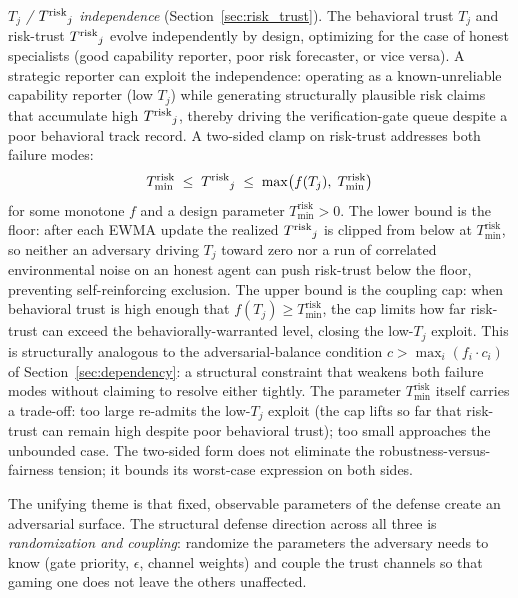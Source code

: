 \emph{$T_j$ / ${T^{\mathrm{risk}}}_j$ independence}
(Section~\ref{sec:risk_trust}). The behavioral trust $T_j$ and
risk-trust ${T^{\mathrm{risk}}}_j$ evolve independently by design, optimizing
for the case of honest specialists (good capability reporter, poor
risk forecaster, or vice versa). A strategic reporter can exploit
the independence: operating as a known-unreliable capability
reporter (low $T_j$) while generating structurally plausible risk
claims that accumulate high ${T^{\mathrm{risk}}}_j$, thereby driving the
verification-gate queue despite a poor behavioral track record. A
two-sided clamp on risk-trust addresses both failure modes:
\begin{equation}
\label{eq:coupling_clamp}
T^{\mathrm{risk}}_{\min}
\;\leq\; {T^{\mathrm{risk}}}_j
\;\leq\; \max\bigl(f(T_j),\; T^{\mathrm{risk}}_{\min}\bigr)
\end{equation}
for some monotone $f$ and a design parameter
$T^{\mathrm{risk}}_{\min} > 0$. The lower bound is the floor:
after each EWMA update the realized ${T^{\mathrm{risk}}}_j$ is clipped from
below at $T^{\mathrm{risk}}_{\min}$, so neither an adversary
driving $T_j$ toward zero nor a run of correlated environmental
noise on an honest agent can push risk-trust below the floor,
preventing self-reinforcing exclusion. The upper bound is the
coupling cap: when behavioral trust is high enough that
$f(T_j) \geq T^{\mathrm{risk}}_{\min}$, the cap limits how far
risk-trust can exceed the behaviorally-warranted level, closing
the low-$T_j$ exploit. This is structurally analogous to the
adversarial-balance condition
$c > \max_i(f_i \cdot c_i)$ of Section~\ref{sec:dependency}: a
structural constraint that weakens both failure modes without
claiming to resolve either tightly. The parameter
$T^{\mathrm{risk}}_{\min}$ itself carries a trade-off: too large
re-admits the low-$T_j$ exploit (the cap lifts so far that
risk-trust can remain high despite poor behavioral trust); too
small approaches the unbounded case. The two-sided form does not
eliminate the robustness-versus-fairness tension; it bounds its
worst-case expression on both sides.

The unifying theme is that fixed, observable parameters of the
defense create an adversarial surface. The structural defense
direction across all three is \emph{randomization and coupling}:
randomize the parameters the adversary needs to know (gate
priority, $\epsilon$, channel weights) and couple the trust
channels so that gaming one does not leave the others unaffected.

